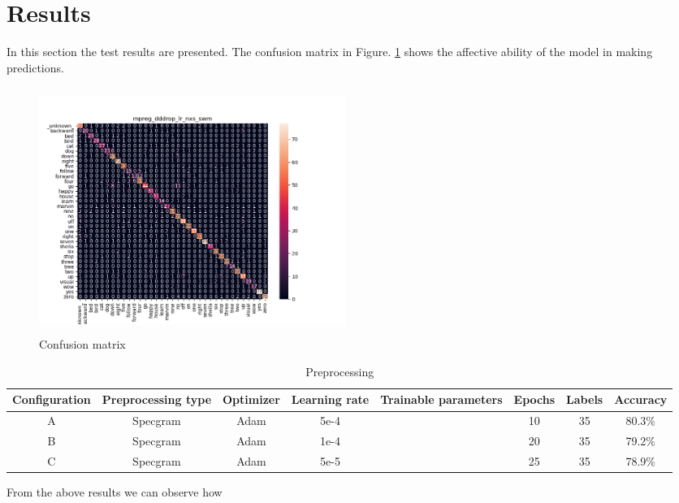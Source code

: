 
\section{Results}
\label{sec:results}
\noindent In this section the test results are presented. The confusion matrix in Figure. \ref{fig:conf_matrix_cnn} shows the affective ability of the model in making predictions.

\begin{figure}[h]
			\centering
	    	\includegraphics[width=10cm, height=8cm]{conf_matrix_cnn_dii_cm}
	    	\caption{Confusion matrix}
	    	\label{fig:conf_matrix_cnn}
\end{figure} 

\begin{table}[ht]
	\centering
	\begin{tabular}{|c c c c c c c c|}
		\hline
		Configuration & Preprocessing type & Optimizer & Learning rate & Trainable parameters & Epochs  & Labels & Accuracy \\
		\hline
		A &Specgram&Adam&5e-4&&10&35&80.3\% \\
		B &Specgram&Adam&1e-4&&20&35&79.2\% \\
		C &Specgram&Adam&5e-5&&25&35&78.9\% \\
		\hline
	\end{tabular}
	\caption{Preprocessing}
	\label{table:Pr_eprocessing}
\end{table}



\noindent From the above results we can observe how {}